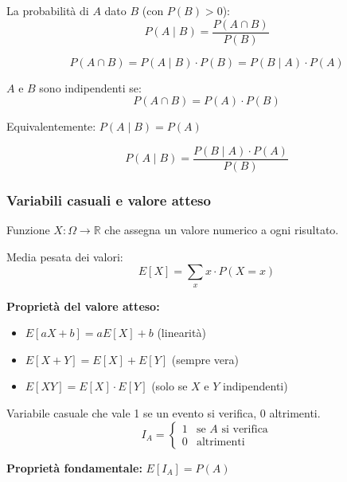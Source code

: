 \begin{definizione}
	La probabilità di $A$ dato $B$ (con $P(B) > 0$):
	\[
	P(A \mid B) = \frac{P(A \cap B)}{P(B)}
	\]
\end{definizione}

\begin{teorema}
	\[
	P(A \cap B) = P(A \mid B) \cdot P(B) = P(B \mid A) \cdot P(A)
	\]
\end{teorema}

\begin{definizione}
	$A$ e $B$ sono indipendenti se:
	\[
	P(A \cap B) = P(A) \cdot P(B)
	\]
	
	Equivalentemente: $P(A \mid B) = P(A)$
\end{definizione}

\begin{teorema}
	\[
	P(A \mid B) = \frac{P(B \mid A) \cdot P(A)}{P(B)}
	\]
\end{teorema}

\subsubsection{Variabili casuali e valore atteso}

\begin{definizione}
	Funzione $X: \Omega \to \mathbb{R}$ che assegna un valore numerico a ogni risultato.
\end{definizione}

\begin{definizione}
	Media pesata dei valori:
	\[
	E[X] = \sum_{x} x \cdot P(X = x)
	\]
\end{definizione}

\textbf{Proprietà del valore atteso:}
\begin{itemize}
	\item $E[aX + b] = aE[X] + b$ (linearità)
	\item $E[X + Y] = E[X] + E[Y]$ (sempre vera)
	\item $E[XY] = E[X] \cdot E[Y]$ (solo se $X$ e $Y$ indipendenti)
\end{itemize}

\begin{definizione}
	Variabile casuale che vale 1 se un evento si verifica, 0 altrimenti.
	\[
	I_A = \begin{cases}
		1 & \text{se } A \text{ si verifica} \\
		0 & \text{altrimenti}
	\end{cases}
	\]
	
	\textbf{Proprietà fondamentale:} $E[I_A] = P(A)$
\end{definizione}


